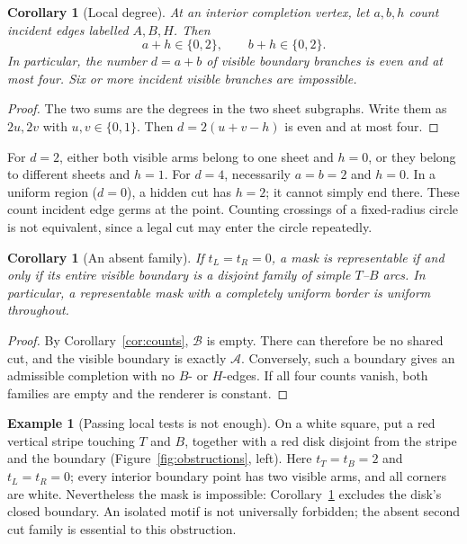 \documentclass[11pt,a4paper]{article}
\newtheorem{corollary}[theorem]{Corollary}
\theoremstyle{definition}
\newtheorem{example}[theorem]{Example}
\begin{document}
\begin{corollary}[Local degree]\label{cor:degree}
At an interior completion vertex, let $a,b,h$ count incident edges labelled
$A,B,H$. Then
\begin{equation}\label{eq:degree}
  a+h\in\{0,2\},\qquad b+h\in\{0,2\}.
\end{equation}
In particular, the number $d=a+b$ of visible boundary branches is even and
at most four. Six or more incident visible branches are impossible.
\end{corollary}
\begin{proof}
The two sums are the degrees in the two sheet subgraphs. Write them as
$2u,2v$ with $u,v\in\{0,1\}$. Then $d=2(u+v-h)$ is even and at most four.
\end{proof}
For $d=2$, either both visible arms belong to one sheet and $h=0$, or they
belong to different sheets and $h=1$. For $d=4$, necessarily $a=b=2$ and
$h=0$. In a uniform region ($d=0$), a hidden cut has $h=2$; it cannot simply
end there. These count incident edge germs at the point. Counting crossings
of a fixed-radius circle is not equivalent, since a legal cut may enter the
circle repeatedly.

\begin{corollary}[An absent family]\label{cor:absent}
If $t_L=t_R=0$, a mask is representable if and only if its entire visible
boundary is a disjoint family of simple $T$--$B$ arcs. In particular, a
representable mask with a completely uniform border is uniform throughout.
\end{corollary}
\begin{proof}
By Corollary~\ref{cor:counts}, $\mathcal B$ is empty. There can therefore be
no shared cut, and the visible boundary is exactly $\mathcal A$. Conversely,
such a boundary gives an admissible completion with no $B$- or $H$-edges.
If all four counts vanish, both families are empty and the renderer is constant.
\end{proof}

\begin{samepage}
\begin{example}[Passing local tests is not enough]\label{ex:stripe}
On a white square, put a red vertical stripe touching $T$ and $B$, together
with a red disk disjoint from the stripe and the boundary
(Figure~\ref{fig:obstructions}, left). Here $t_T=t_B=2$ and $t_L=t_R=0$;
every interior boundary point has two visible arms, and all corners are
white. Nevertheless the mask is impossible: Corollary~\ref{cor:absent}
excludes the disk's closed boundary. An isolated motif is not universally
forbidden; the absent second cut family is essential to this obstruction.
\end{example}
\end{samepage}
\end{document}
